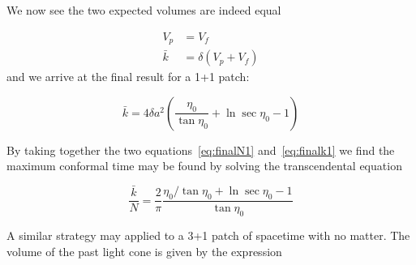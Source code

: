 \documentclass[preprint,notitlepage,amsmath,amssymb,floatfix]{revtex4-1}
\begin{document}
\noindent We now see the two expected volumes are indeed equal

\begin{align}
V_p &= V_f \\
\bar{k} &= \delta\left( V_p + V_f \right)
\end{align}
\noindent and we arrive at the final result for a 1+1 patch:

\begin{equation}
\label{eq:finalk1}
\bar k = 4 \delta a^2 \left( \frac{\eta_0}{\tan\eta_0} + \ln\sec\eta_0 - 1 \right)
\end{equation}

\noindent By taking together the two equations~\eqref{eq:finalN1} and~\eqref{eq:finalk1} we find the maximum conformal time may be found by solving the transcendental equation

\begin{equation}
\label{eq:trans1}
\frac{\bar k}{N} = \frac{2}{\pi}\frac{\eta_0 / \tan\eta_0 + \ln\sec\eta_0 - 1}{\tan\eta_0}
\end{equation}

\noindent A similar strategy may applied to a 3+1 patch of spacetime with no matter.  The volume of the past light cone is given by the expression
\end{document}
